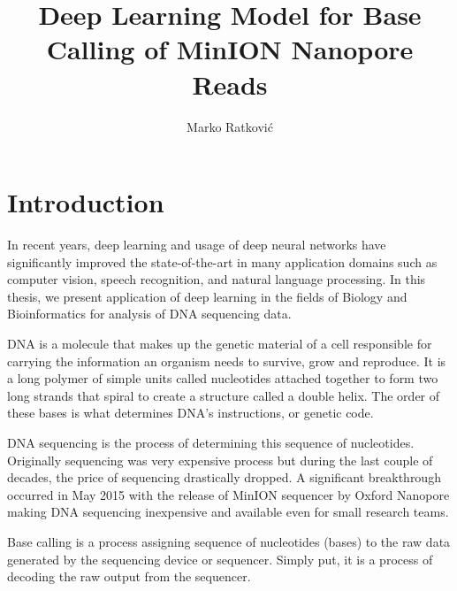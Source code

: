 \documentclass[times, utf8, diplomski, numeric, english]{fer}
\begin{document}
\title{Deep Learning Model for Base Calling of MinION Nanopore Reads}
\author{Marko Ratković}

\maketitle

\izvornik


\tableofcontents
\listoffigures
\listoftables

\chapter{Introduction}

In recent years,  deep learning and usage of deep neural networks have significantly improved the state-of-the-art in many application domains such as computer vision, speech recognition, and natural language processing\cite{LeCun:1998:CNI:303568.303704}\cite{NIPS2012_4824}. 
In this thesis, we present application of deep learning in the fields of Biology and Bioinformatics for analysis of DNA sequencing data. 

DNA is a molecule that makes up the genetic material of a cell responsible for carrying the information an organism needs to survive, grow and reproduce. 
It is a long polymer of simple units called nucleotides attached together to form two long strands that spiral to create a structure called a double helix. The order of these bases is what determines DNA's instructions, or genetic code.

DNA sequencing is the process of determining this sequence of nucleotides. Originally sequencing was very expensive process but 
during the last couple of decades, the price of sequencing drastically dropped. A significant breakthrough occurred in May 2015 with the release of MinION sequencer by Oxford Nanopore making DNA sequencing inexpensive and available even for small research teams. 

Base calling is a process assigning sequence of nucleotides (bases) to the raw data generated by the sequencing device or sequencer. Simply put, it is a process of decoding the raw output from the sequencer.
\end{document}
